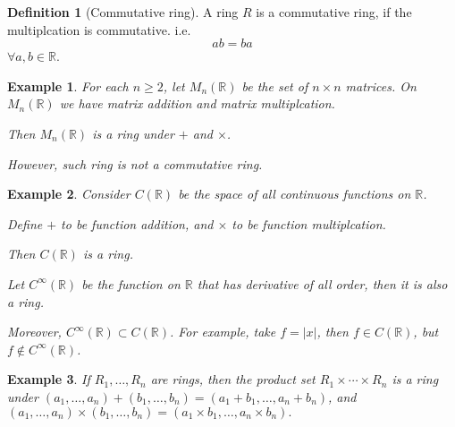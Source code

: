 \documentclass{article}
\theoremstyle{MyNonumberplain}
\theoremstyle{break}
\newcommand{\nin}{\not\in}
\theoremstyle{break}
\newtheorem{example}{Example}[section]
\theoremstyle{break}
\theoremstyle{definition}
\theoremstyle{break}
\newtheorem{definition}{Definition}[section]
\begin{document}
\begin{defbox}
    \begin{definition}[Commutative ring]
        A ring $R$ is a commutative ring, if the multiplcation is commutative. i.e.
        \[ a b = b a \]
        $\forall a, b \in \mathbb{R}$.
    \end{definition}
\end{defbox}

\begin{expbox}
    \begin{example}
        For each $n \geq 2$, let $M_n (\mathbb{R})$ be the set of $n \times n$
        matrices. On $M_n (\mathbb{R})$ we have matrix addition and matrix
        multiplcation.\bigskip
        
        Then $M_n (\mathbb{R})$ is a ring under $+$ and $\times$.\bigskip
        
        However, such ring is not a commutative ring.
    \end{example}
\end{expbox}

\begin{expbox}
    \begin{example}
        Consider $C (\mathbb{R})$ be the space of all continuous functions on
        $\mathbb{R}$.\bigskip
        
        Define $+$ to be function addition, and $\times$ to be function multiplcation.\bigskip
        
        Then $C (\mathbb{R})$ is a ring.\bigskip
        
        Let $C^{\infty} (\mathbb{R})$ be the function on $\mathbb{R}$ that has
        derivative of all order, then it is also a ring.\bigskip
        
        Moreover, $C^{\infty} (\mathbb{R}) \subset C (\mathbb{R})$. For example, take
        $f = | x |$, then $f \in C (\mathbb{R})$, but $f \nin C^{\infty}
        (\mathbb{R})$.
    \end{example}
\end{expbox}

\begin{expbox}
    \begin{example}
        If $R_1, \ldots, R_n$ are rings, then the product set $R_1 \times \cdots
        \times R_n$ is a ring under $(a_1, \ldots, a_n) + (b_1, \ldots, b_n) = (a_1 + b_1, \ldots, a_n + b_n)$, and $(a_1, \ldots, a_n) \times (b_1, \ldots, b_n) = (a_1 \times b_1, \ldots, a_n \times b_n).$
    \end{example}
\end{expbox}
\end{document}

